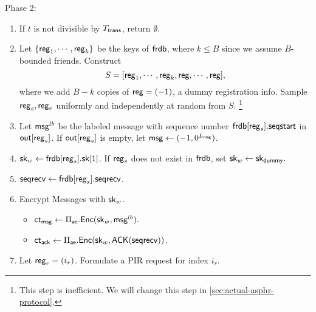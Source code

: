 \begin{definition}
Phase 2:
\begin{enumerate}
    \item If $t$ is not divisible by $T_{\mathsf{trans}}$, return $\emptyset$.
    \item Let $\{\mathsf{reg}_1, \cdots, \mathsf{reg}_k\}$ be the keys of $\mathsf{frdb}$, where $k\leq B$ since we assume $B$-bounded friends. Construct 
    $$S = [\mathsf{reg}_1, \cdots, \mathsf{reg}_k, \mathsf{reg}, \cdots, \mathsf{reg}],$$ 
    where we add $B - k$ copies of $\mathsf{reg} = (-1)$, a dummy registration info. Sample $\mathsf{reg}_s, \mathsf{reg}_r$ uniformly and independently at random from $S$. \footnote{This step is inefficient. We will change this step in \cref{sec:actual-asphr-protocol}.}
    \item Let $\mathsf{msg}^{lb}$ be the labeled message with sequence number $\mathsf{frdb}[\mathsf{reg}_s].\mathsf{seqstart}$ in $\mathsf{out}[\mathsf{reg}_s]$. If $\mathsf{out}[\mathsf{reg}_s]$ is empty, let $\mathsf{msg} \leftarrow (-1, 0^{L_{\mathsf{msg}}})$.
    \item ${\mathsf{sk}}_w \leftarrow \mathsf{frdb}[\mathsf{reg}_s].{\mathsf{sk}}[1]$. If $\mathsf{reg}_s$ does not exist in $\mathsf{frdb}$, set ${\mathsf{sk}}_w \leftarrow {\ensuremath{\mathsf{sk}}}_{\mathsf{dummy}}.$
    \item $\mathsf{seqrecv} \leftarrow \mathsf{frdb}[\mathsf{reg}_s].\mathsf{seqrecv}$.
    \item Encrypt Messages with ${\mathsf{sk}}_w$.
    \begin{itemize}
        \item $\mathsf{ct}_{\mathsf{msg}} \leftarrow \Pi_{\mathsf{ae}}.\mathsf{Enc}({\mathsf{sk}}_w, \mathsf{msg}^{lb}).$
        \item $\mathsf{ct}_{\mathsf{ack}} \leftarrow \Pi_{\mathsf{ae}}.\mathsf{Enc}({\mathsf{sk}}_w, \mathsf{ACK}(\mathsf{seqrecv}))$. 
    \end{itemize}
    \item Let $\mathsf{reg}_r = (i_r)$. Formulate a PIR request for index $i_r$. %
    \begin{itemize}

\end{itemize}
\end{enumerate}
\end{definition}
